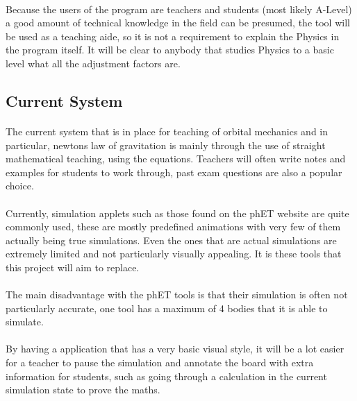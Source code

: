 \paragraph{}
Because the users of the program are teachers and students (most likely A-Level) a good amount of technical knowledge in the field can be presumed, the tool will be used as a teaching aide, so it is not a requirement to explain the Physics in the program itself. It will be clear to anybody that studies Physics to a basic level what all the adjustment factors are.

\subsection{Current System}
\paragraph{}
The current system that is in place for teaching of orbital mechanics and in particular, newtons law of gravitation is mainly through the use of straight mathematical teaching, using the equations. Teachers will often write notes and examples for students to work through, past exam questions are also a popular choice.

\paragraph{}
Currently, simulation applets such as those found on the phET website are quite commonly used, these are mostly predefined animations with very few of them actually being true simulations.
Even the ones that are actual simulations are extremely limited and not particularly visually appealing. It is these tools that this project will aim to replace.

\paragraph{}
The main disadvantage with the phET tools is that their simulation is often not particularly accurate, one tool has a maximum of 4 bodies that it is able to simulate.

\paragraph{}
By having a application that has a very basic visual style, it will be a lot easier for a teacher to pause the simulation and annotate the board with extra information for students, such as going through a calculation in the current simulation state to prove the maths.

